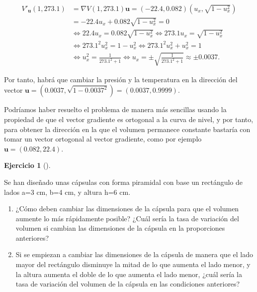 \documentclass[
  spanish,
  a4paper,
]{scrreport}
\theoremstyle{definition}
\newtheorem{exercise}{Ejercicio}[chapter]
\theoremstyle{remark}
\begin{document}
\begin{tcolorbox}
\begin{enumerate}
  \begin{align*}
  V'_{\mathbf{u}}(1,273.1) 
  &= \nabla V(1, 273.1) \mathbf{u}
  = (-22.4, 0.082)(u_x,\sqrt{1-u_x^2}) \\ 
  &= -22.4 u_x + 0.082 \sqrt{1-u_x^2}
  = 0 \\
  &\Leftrightarrow 22.4 u_x = 0.082\sqrt{1-u_x^2}
  \Leftrightarrow 273.1 u_x = \sqrt{1-u_x^2} \\
  &\Leftrightarrow 273.1^2 u_x^2 = 1-u_x^2 
  \Leftrightarrow 273.1^2 u_x^2 + u_x^2 = 1 \\ 
  &\Leftrightarrow u_x^2 = \frac{1}{273.1^2+1}
  \Leftrightarrow u_x = \pm \sqrt{\frac{1}{273.1^2+1}}
  \approx \pm 0.0037.
  \end{align*}

  Por tanto, habrá que cambiar la presión y la temperatura en la
  dirección del vector
  \(\mathbf{u}=(0.0037, \sqrt{1-0.0037^2}) = (0.0037, 0.9999)\).

  Podríamos haber resuelto el problema de manera más sencillas usando la
  propiedad de que el vector gradiente es ortogonal a la curva de nivel,
  y por tanto, para obtener la dirección en la que el volumen permanece
  constante bastaría con tomar un vector ortogonal al vector gradiente,
  como por ejemplo \(\mathbf{u}=(0.082, 22.4)\).
\end{enumerate}

\end{tcolorbox}

\begin{exercise}[]\protect\hypertarget{exr-derivada-direccional-capsulas}{}\label{exr-derivada-direccional-capsulas}

Se han diseñado unas cápsulas con forma piramidal con base un rectángulo
de lados a=3 cm, b=4 cm, y altura h=6 cm.

\begin{enumerate}
\def\labelenumi{\alph{enumi}.}
\item
  ¿Cómo deben cambiar las dimensiones de la cápsula para que el volumen
  aumente lo más rápidamente posible? ¿Cuál sería la tasa de variación
  del volumen si cambian las dimensiones de la cápsula en la
  proporciones anteriores?
\item
  Si se empiezan a cambiar las dimensiones de la cápsula de manera que
  el lado mayor del rectángulo disminuye la mitad de lo que aumenta el
  lado menor, y la altura aumenta el doble de lo que aumenta el lado
  menor, ¿cuál sería la tasa de variación del volumen de la cápsula en
  las condiciones anteriores?
\end{enumerate}

\end{exercise}
\end{document}
